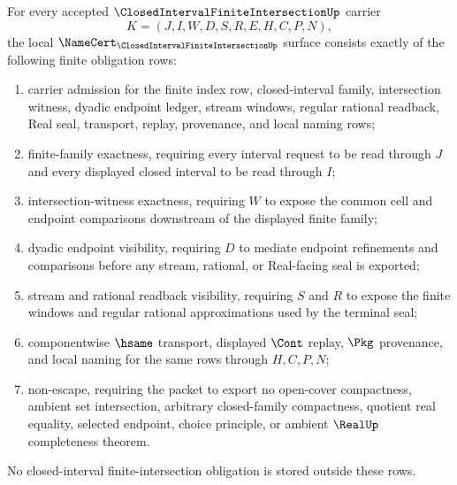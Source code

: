 \begin{theorem}
\label{thm:closed-interval-finite-intersection-namecert-obligations}
For every accepted $\ClosedIntervalFiniteIntersectionUp$ carrier
$$
K=(J,I,W,D,S,R,E,H,C,P,N),
$$
the local $\NameCert_{\ClosedIntervalFiniteIntersectionUp}$ surface consists exactly of the following finite obligation rows:
\begin{enumerate}
\item carrier admission for the finite index row, closed-interval family, intersection witness, dyadic endpoint ledger, stream windows, regular rational readback, Real seal, transport, replay, provenance, and local naming rows;
\item finite-family exactness, requiring every interval request to be read through $J$ and every displayed closed interval to be read through $I$;
\item intersection-witness exactness, requiring $W$ to expose the common cell and endpoint comparisons downstream of the displayed finite family;
\item dyadic endpoint visibility, requiring $D$ to mediate endpoint refinements and comparisons before any stream, rational, or Real-facing seal is exported;
\item stream and rational readback visibility, requiring $S$ and $R$ to expose the finite windows and regular rational approximations used by the terminal seal;
\item componentwise $\hsame$ transport, displayed $\Cont$ replay, $\Pkg$ provenance, and local naming for the same rows through $H,C,P,N$;
\item non-escape, requiring the packet to export no open-cover compactness, ambient set intersection, arbitrary closed-family compactness, quotient real equality, selected endpoint, choice principle, or ambient $\RealUp$ completeness theorem.
\end{enumerate}
No closed-interval finite-intersection obligation is stored outside these rows.
\end{theorem}
